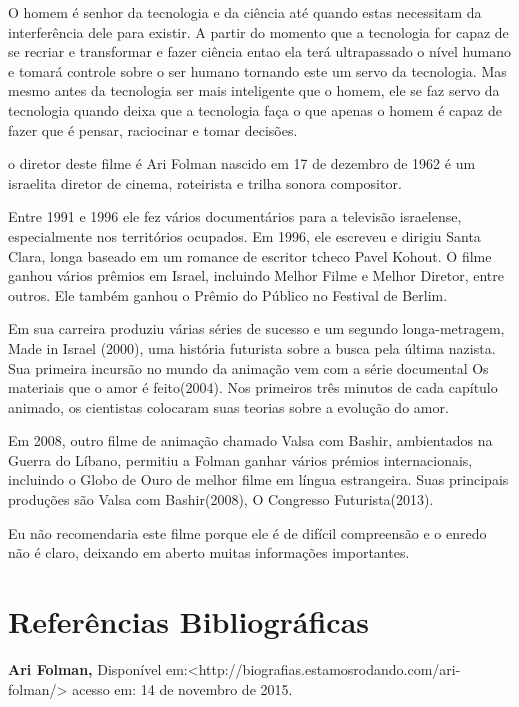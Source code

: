 \documentclass[a4paper,12pt]{article}
\begin{document}
O homem é senhor da tecnologia e da ciência até quando estas necessitam da interferência dele para existir. A partir do momento que a tecnologia for capaz de se recriar e transformar e fazer ciência entao ela terá ultrapassado o nível humano e tomará controle sobre o ser humano tornando este um servo da tecnologia. Mas mesmo antes da tecnologia ser mais inteligente que o homem, ele se faz servo da tecnologia quando deixa que a tecnologia faça o que apenas o homem é capaz de fazer que é pensar, raciocinar e tomar decisões.

o diretor deste filme é Ari Folman nascido em 17 de dezembro de 1962 é um israelita diretor de cinema, roteirista e trilha sonora compositor.

Entre 1991 e 1996 ele fez vários documentários para a televisão israelense, especialmente nos territórios ocupados. Em 1996, ele escreveu e dirigiu Santa Clara, longa baseado em um romance de escritor tcheco Pavel Kohout. O filme ganhou vários prêmios em Israel, incluindo Melhor Filme e Melhor Diretor, entre outros. Ele também ganhou o Prêmio do Público no Festival de Berlim.

Em sua carreira produziu várias séries de sucesso e um segundo longa-metragem, Made in Israel (2000), uma história futurista sobre a busca pela última nazista. Sua primeira incursão no mundo da animação vem com a série documental Os materiais que o amor é feito(2004). Nos primeiros três minutos de cada capítulo animado, os cientistas colocaram suas teorias sobre a evolução do amor.

Em 2008, outro filme de animação chamado Valsa com Bashir, ambientados na Guerra do Líbano, permitiu a Folman ganhar vários prémios internacionais, incluindo o Globo de Ouro de melhor filme em língua estrangeira. Suas principais produções são Valsa com Bashir(2008),  O Congresso Futurista(2013).

Eu não recomendaria este filme porque ele é de difícil compreensão e o enredo não é claro, deixando em aberto muitas informações importantes.
\\

\begin{center}
\end{center}

\section*{Referências Bibliográficas}

\textbf{Ari Folman,} Disponível em:<http://biografias.estamosrodando.com/ari-folman/> acesso em: 14 de novembro de 2015. 
\end{document}
